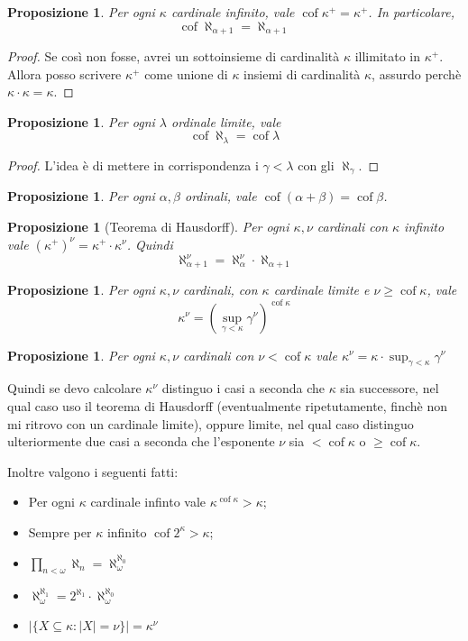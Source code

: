 \documentclass[a4paper,10pt,oneside]{article}
\DeclareMathOperator{\cof}{cof}
\theoremstyle{plain}
\newtheorem{myprop}[mytheorem]{Proposizione}
\theoremstyle{definition}
\theoremstyle{remark}
\begin{document}
\begin{myprop}
 Per ogni $\kappa$ cardinale infinito, vale $\cof\kappa^+ = \kappa^+$. In particolare, \[\cof\aleph_{\alpha+1}=\aleph_{\alpha+1}\]
\end{myprop}
\begin{proof}
 Se così non fosse, avrei un sottoinsieme di cardinalità $\kappa$ illimitato in $\kappa^+$. Allora posso scrivere $\kappa^+$ come unione di $\kappa$ insiemi di cardinalità $\kappa$, assurdo perchè $\kappa\cdot\kappa=\kappa$.
\end{proof}
\begin{myprop}
 Per ogni $\lambda$ ordinale limite, vale \[\cof \aleph_\lambda =\cof \lambda\]
\end{myprop}
\begin{proof}
 L'idea è di mettere in corrispondenza i $\gamma < \lambda$ con gli $\aleph_\gamma$.
\end{proof}

\begin{myprop}
 Per ogni $\alpha, \beta$ ordinali, vale $\cof(\alpha+\beta) = \cof \beta$.
\end{myprop}

\begin{myprop}[Teorema di Hausdorff]
 Per ogni $\kappa,\nu$ cardinali con $\kappa$ infinito vale ${\left(\kappa^+\right)}^\nu=\kappa^+\cdot \kappa^\nu$. Quindi
 \[\aleph_{\alpha+1}^\nu=\aleph_{\alpha}^\nu\cdot \aleph_{\alpha+1}\]
\end{myprop}

\begin{myprop}
 Per ogni $\kappa,\nu$ cardinali, con $\kappa$ cardinale limite e $\nu \ge \cof \kappa$, vale \[\kappa^\nu={\left(\sup_{\gamma<\kappa}\gamma^\nu\right)}^{\cof\kappa}\]
\end{myprop}

\begin{myprop}
 Per ogni $\kappa,\nu$ cardinali con $\nu < \cof \kappa$ vale $\kappa^\nu=\kappa \cdot \sup_{\gamma<\kappa}\gamma^\nu$
\end{myprop}
%
Quindi se devo calcolare $\kappa^\nu$ distinguo i casi a seconda che $\kappa$ sia successore, nel qual caso uso il teorema di Hausdorff (eventualmente ripetutamente, finchè non mi ritrovo con un cardinale limite), oppure limite, nel qual caso distinguo ulteriormente due casi a seconda che l'esponente $\nu$ sia $<\cof \kappa$ o $\ge \cof \kappa$.

Inoltre valgono i seguenti fatti: 

\begin{itemize}
\item Per ogni $\kappa$ cardinale infinto vale $\kappa^{\cof\kappa}>\kappa$;
\item Sempre per $\kappa$ infinito $\cof 2^\kappa>\kappa$;
\item $\prod_{n<\omega}\aleph_n=\aleph_\omega^{\aleph_0}$
\item $\aleph_\omega^{\aleph_1}=2^{\aleph_1}\cdot \aleph_\omega^{\aleph_0}$
\item $|\{X\subseteq \kappa: |X|=\nu\}|=\kappa^\nu$
\end{itemize}
\end{document}
